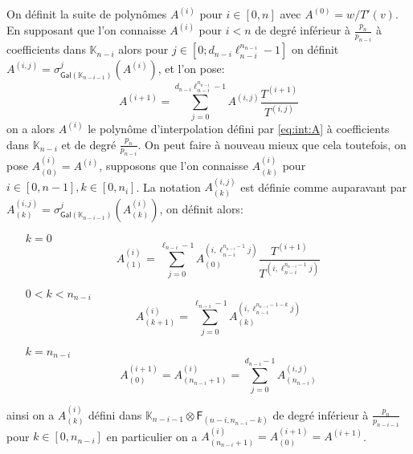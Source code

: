 \documentclass[10pt,a4paper]{book}
\theoremstyle{plain}
\theoremstyle{definition}
\theoremstyle{definition}
\theoremstyle{definition}
\theoremstyle{definition}
\theoremstyle{remark}
\theoremstyle{remark}
\theoremstyle{definition}
\begin{document}
On définit la suite de polynômes $A^{(i)}$ pour $i \in [0, n]$ avec
 $A^{(0)}=w/T'(v)$. En  supposant que l'on connaisse $A^{(i)}$ pour $i < n$ 
 de degré inférieur à $\frac{p_n}{p_{n-i}}$ à coefficients dans 
 $\mathbb{K}_{n-i}$ alors pour $j \in [0 ; d_{n-i}\ell_{n-i}^{n_{n-i}}-1]$ on définit
 $A^{(i,j)}=\sigma_{\mathsf{Gal}(\mathbb{K}_{n-i-1})}^j(A^{(i)})$, et l'on pose:  
\begin{equation*}
A^{(i+1)}=\sum_{j=0}^{d_{n-i}\ell_{n-i}^{n_{n-i}}-1}A^{(i,j)}\frac{T^{(i+1)}}{T^{(i,j)}} 
\end{equation*}
on a alors $A^{(i)}$ le polynôme d'interpolation défini par \ref{eq:int:A} 
à coefficients dans $\mathbb{K}_{n-i}$ et de degré $\frac{p_n}{p_{n-i}}$.
On peut faire à nouveau mieux que cela toutefois, on pose
$A^{(i)}_{(0)}=A^{(i)}$, supposons que l'on connaisse  $A^{(i)}_{(k)}$ pour 
$i \in [0,n-1], k \in [0,n_i]$. La notation $A^{(i,j)}_{(k)}$ est définie comme
 auparavant par $A^{(i,j)}_{(k)}=\sigma^j_{\mathsf{Gal}(\mathbb{K}_{n-i-1})}
 (A^{(i)}_{(k)})$, on définit alors:
 \begin{itemize}
 \item[$k=0$]
 \[
A^{(i)}_{(1)}=\sum_{j=0}^{\ell_{n-i}-1 }A^{(i,\ell_{n-i}^{n_{n-i}-1}j)}_{(0)}\frac{T^{(i+1)}}{T^{(i,\ell_{n-i}^{n_{n-i}-1}j)}}  \]
\item[$0<k<n_{n-i}$]
\[
A^{(i)}_{(k+1)}=\sum_{j=0}^{\ell_{n-i}-1 }A^{(i,\ell_{n-i}^{n_{n-i}-1-k}j)}_{(k)}  \]
 \item[$k=n_{n-i}$] \[
 A^{(i+1)}_{(0)}=A^{(i)}_{(n_{n-i}+1)}=\sum_{j=0}^{d_{n-i}-1} A^{(i,j)}_{(n_{n-i})}  
  \]
 \end{itemize}
ainsi on a $A^{(i)}_{(k)}$ défini dans $\mathbb{K}_{n-i-1} \otimes \mathsf{F}_{(n-i,n_{n-i}-k)}$
de degré inférieur à $\frac{p_n}{p_{n-i-1}}$ pour $k \in [0,n_{n-i}]$ en 
particulier on a $A^{(i)}_{(n_{n-i}+1)}=A^{(i+1)}_{(0)}=A^{(i+1)}$.  
\end{document}
